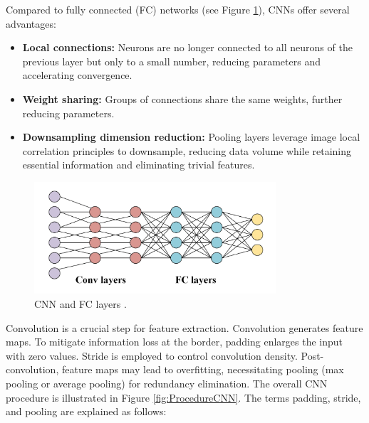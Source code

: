 Compared to fully connected (FC) networks (see Figure \ref{fig:CNNandFCLayers}), CNNs offer several advantages:

\begin{itemize}
	\item \textbf{Local connections:} Neurons are no longer connected to all neurons of the previous layer but only to a small number, reducing parameters and accelerating convergence.
	\item \textbf{Weight sharing:} Groups of connections share the same weights, further reducing parameters.
	\item \textbf{Downsampling dimension reduction:} Pooling layers leverage image local correlation principles to downsample, reducing data volume while retaining essential information and eliminating trivial features.
\end{itemize}

\begin{figure}[h!]
	\centering
	\includegraphics[width=0.8\textwidth]{Images/DataMining/CNNandFCLayers}
	\caption{CNN and FC layers \cite{Li:2021}.} \label{fig:CNNandFCLayers}
\end{figure}


Convolution is a crucial step for feature extraction. Convolution generates feature maps. To mitigate information loss at the border, padding enlarges the input with zero values. Stride is employed to control convolution density. Post-convolution, feature maps may lead to overfitting, necessitating pooling (max pooling or average pooling) for redundancy elimination. The overall CNN procedure is illustrated in Figure \ref{fig:ProcedureCNN}. The terms padding, stride, and pooling are explained as follows:

